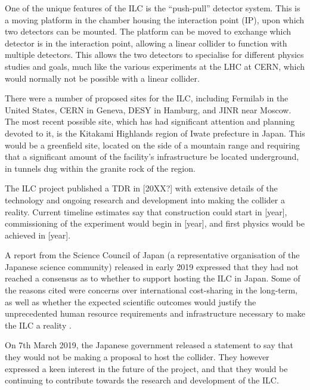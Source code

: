 One of the unique features of the \acrshort{ILC} is the ``push-pull'' detector system. This is a moving platform in the chamber housing the interaction point (\acrshort{IP}), upon which two detectors can be mounted. The platform can be moved to exchange which detector is in the interaction point, allowing a linear collider to function with multiple detectors. This allows the two detectors to specialise for different physics studies and goals, much like the various experiments at the \acrshort{LHC} at \acrshort{CERN}, which would normally not be possible with a linear collider.

There were a number of proposed sites for the \acrshort{ILC}, including Fermilab in the United States, \acrshort{CERN} in Geneva, \acrshort{DESY} in Hamburg, and \acrshort{JINR} near Moscow. The most recent possible site, which has had significant attention and planning devoted to it, is the Kitakami Highlands region of Iwate prefecture in Japan. This would be a greenfield site, located on the side of a mountain range and requiring that a significant amount of the facility's infrastructure be located underground, in tunnels dug within the granite rock of the region. 

The \acrshort{ILC} project published a \acrfull{TDR} in [20XX?] with extensive details of the technology and ongoing research and development into making the collider a reality. Current timeline estimates say that construction could start in [year], commissioning of the experiment would begin in [year], and first physics would be achieved in [year].

A report from the Science Council of Japan (a representative organisation of the Japanese science community) released in early 2019 expressed that they had not reached a consensus as to whether to support hosting the \acrshort{ILC} in Japan. Some  of the reasons cited were concerns over international cost-sharing in the long-term, as well as whether the expected scientific outcomes would justify the unprecedented human resource requirements and infrastructure necessary to make the \acrshort{ILC} a reality \cite{linearcolliders-scj-report}.

On 7th March 2019, the Japanese government released a statement to say that they would not be making a proposal to host the collider. They however expressed a keen interest in the future of the project, and that they would be continuing to contribute towards the research and development of the \acrshort{ILC}.

